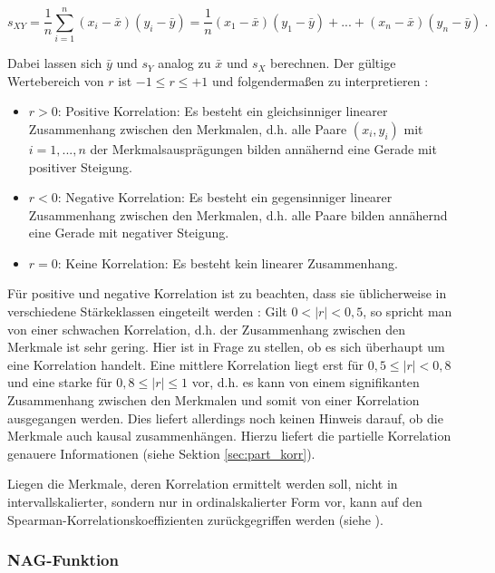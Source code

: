 \begin{equation*}
	s_{XY}=\dfrac{1}{n}\sum_{i=1}^{n}{(x_i-\bar{x})(y_i-\bar{y})}=\dfrac{1}{n}(x_1-\bar{x})(y_1-\bar{y})+...+(x_n-\bar{x})(y_n-\bar{y}) ~.
\end{equation*}

\noindent Dabei lassen sich $\bar{y}$ und $s_{Y}$ analog zu $\bar{x}$ und $s_{X}$ berechnen. Der gültige Wertebereich von $r$ ist $-1 \leq r \leq +1$ und folgendermaßen zu interpretieren \cite[S. 137]{Fahrmeir2010}:
\begin{itemize}
    \item $r>0$: Positive Korrelation: Es besteht ein gleichsinniger linearer Zusammenhang zwischen den Merkmalen, d.h. alle Paare $(x_i, y_i)$ mit $i=1,...,n$ der Merkmalsausprägungen bilden annähernd eine Gerade mit positiver Steigung.
    \item $r<0$: Negative Korrelation: Es besteht ein gegensinniger linearer Zusammenhang zwischen den Merkmalen, d.h. alle Paare bilden annähernd eine Gerade mit negativer Steigung.
    \item $r=0$: Keine Korrelation: Es besteht kein linearer Zusammenhang.
\end{itemize}

\noindent Für positive und negative Korrelation ist zu beachten, dass sie üblicherweise in verschiedene Stärkeklassen eingeteilt werden \cite[S. 139]{Fahrmeir2010}: Gilt $0<|r|<0,5$, so spricht man von einer schwachen Korrelation, d.h. der Zusammenhang zwischen den Merkmale ist sehr gering. Hier ist in Frage zu stellen, ob es sich überhaupt um eine Korrelation handelt. Eine mittlere Korrelation liegt erst für $0,5 \leq |r| < 0,8$ und eine starke für $0,8 \leq |r| \leq 1$ vor, d.h. es kann von einem signifikanten Zusammenhang zwischen den Merkmalen und somit von einer Korrelation ausgegangen werden. Dies liefert allerdings noch keinen Hinweis darauf, ob die Merkmale auch kausal zusammenhängen. Hierzu liefert die partielle Korrelation genauere Informationen (siehe Sektion \ref{sec:part_korr}).

Liegen die Merkmale, deren Korrelation ermittelt werden soll, nicht in intervallskalierter, sondern nur in ordinalskalierter Form vor, kann auf den Spearman-Korrelationskoeffizienten zurückgegriffen werden (siehe ).

\subsubsection{NAG-Funktion}
\label{sec:brav_pear_korr_funk}

